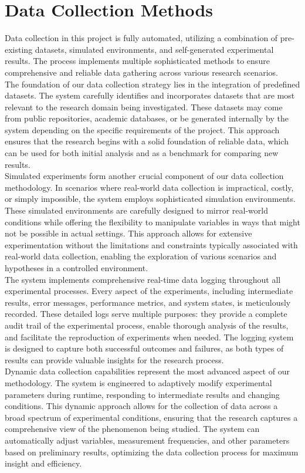 \section{Data Collection Methods}
Data collection in this project is fully automated, utilizing a combination of pre-existing datasets, simulated environments, and self-generated experimental results. The process implements multiple sophisticated methods to ensure comprehensive and reliable data gathering across various research scenarios.\\
The foundation of our data collection strategy lies in the integration of predefined datasets. The system carefully identifies and incorporates datasets that are most relevant to the research domain being investigated. These datasets may come from public repositories, academic databases, or be generated internally by the system depending on the specific requirements of the project. This approach ensures that the research begins with a solid foundation of reliable data, which can be used for both initial analysis and as a benchmark for comparing new results.\\
Simulated experiments form another crucial component of our data collection methodology. In scenarios where real-world data collection is impractical, costly, or simply impossible, the system employs sophisticated simulation environments. These simulated environments are carefully designed to mirror real-world conditions while offering the flexibility to manipulate variables in ways that might not be possible in actual settings. This approach allows for extensive experimentation without the limitations and constraints typically associated with real-world data collection, enabling the exploration of various scenarios and hypotheses in a controlled environment.\\
The system implements comprehensive real-time data logging throughout all experimental processes. Every aspect of the experiments, including intermediate results, error messages, performance metrics, and system states, is meticulously recorded. These detailed logs serve multiple purposes: they provide a complete audit trail of the experimental process, enable thorough analysis of the results, and facilitate the reproduction of experiments when needed. The logging system is designed to capture both successful outcomes and failures, as both types of results can provide valuable insights for the research process.\\
Dynamic data collection capabilities represent the most advanced aspect of our methodology. The system is engineered to adaptively modify experimental parameters during runtime, responding to intermediate results and changing conditions. This dynamic approach allows for the collection of data across a broad spectrum of experimental conditions, ensuring that the research captures a comprehensive view of the phenomenon being studied. The system can automatically adjust variables, measurement frequencies, and other parameters based on preliminary results, optimizing the data collection process for maximum insight and efficiency.

